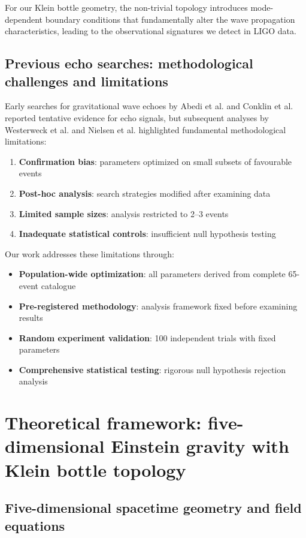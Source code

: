 \documentclass[12pt]{iopart}
\begin{document}
For our Klein bottle geometry, the non-trivial topology introduces mode-dependent boundary conditions that fundamentally alter the wave propagation characteristics, leading to the observational signatures we detect in LIGO data.

\subsection{Previous echo searches: methodological challenges and limitations}

Early searches for gravitational wave echoes by Abedi et al. \cite{Abedi2017} and Conklin et al. \cite{Conklin2018} reported tentative evidence for echo signals, but subsequent analyses by Westerweck et al. \cite{Westerweck2018} and Nielsen et al. \cite{Nielsen2019} highlighted fundamental methodological limitations:

\begin{enumerate}
\item \textbf{Confirmation bias}: parameters optimized on small subsets of favourable events
\item \textbf{Post-hoc analysis}: search strategies modified after examining data
\item \textbf{Limited sample sizes}: analysis restricted to 2--3 events
\item \textbf{Inadequate statistical controls}: insufficient null hypothesis testing
\end{enumerate}

Our work addresses these limitations through:
\begin{itemize}
\item \textbf{Population-wide optimization}: all parameters derived from complete 65-event catalogue
\item \textbf{Pre-registered methodology}: analysis framework fixed before examining results
\item \textbf{Random experiment validation}: 100 independent trials with fixed parameters
\item \textbf{Comprehensive statistical testing}: rigorous null hypothesis rejection analysis
\end{itemize}

\section{Theoretical framework: five-dimensional Einstein gravity with Klein bottle topology}

\subsection{Five-dimensional spacetime geometry and field equations}
\end{document}
